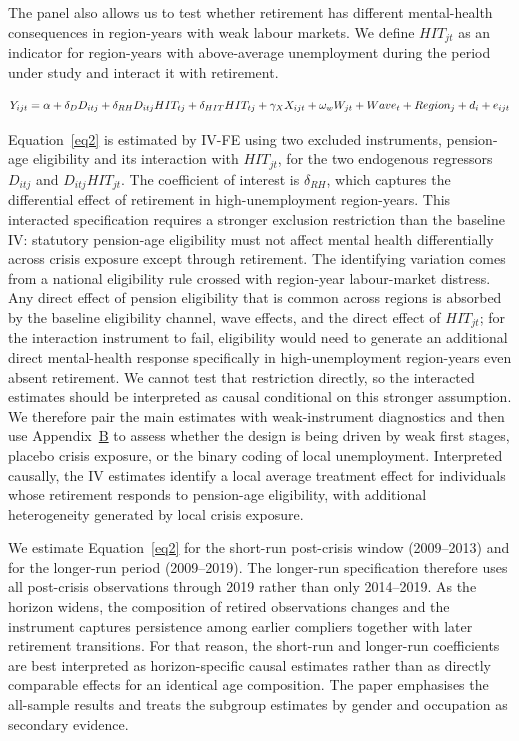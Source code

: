 \documentclass[arguments, manuscript, 11pt]{aastex631}
\begin{document}
The panel also allows us to test whether retirement has different mental-health consequences in region-years with weak labour markets. We define $HIT_{jt}$ as an indicator for region-years with above-average unemployment during the period under study and interact it with retirement.


\begin{equation}
\label{eq2}
\centering
  Y_{ijt} =\alpha + \delta_{D} D_{itj} + \delta_{RH} D_{itj}HIT_{tj} + \delta_{HIT} HIT_{tj} + \gamma_X X_{ijt} + \omega_w W_{jt} + Wave_{t} + Region_j + d_i + e_{ijt} 
\end{equation}

Equation~\ref{eq2} is estimated by IV-FE using two excluded instruments, pension-age eligibility and its interaction with $HIT_{jt}$, for the two endogenous regressors $D_{itj}$ and $D_{itj}HIT_{jt}$. The coefficient of interest is $\delta_{RH}$, which captures the differential effect of retirement in high-unemployment region-years. This interacted specification requires a stronger exclusion restriction than the baseline IV: statutory pension-age eligibility must not affect mental health differentially across crisis exposure except through retirement. The identifying variation comes from a national eligibility rule crossed with region-year labour-market distress. Any direct effect of pension eligibility that is common across regions is absorbed by the baseline eligibility channel, wave effects, and the direct effect of $HIT_{jt}$; for the interaction instrument to fail, eligibility would need to generate an additional direct mental-health response specifically in high-unemployment region-years even absent retirement. We cannot test that restriction directly, so the interacted estimates should be interpreted as causal conditional on this stronger assumption. We therefore pair the main estimates with weak-instrument diagnostics and then use Appendix~\hyperref[sec:appendixB]{B} to assess whether the design is being driven by weak first stages, placebo crisis exposure, or the binary coding of local unemployment. Interpreted causally, the IV estimates identify a local average treatment effect for individuals whose retirement responds to pension-age eligibility, with additional heterogeneity generated by local crisis exposure.

We estimate Equation~\ref{eq2} for the short-run post-crisis window (2009--2013) and for the longer-run period (2009--2019). The longer-run specification therefore uses all post-crisis observations through 2019 rather than only 2014--2019. As the horizon widens, the composition of retired observations changes and the instrument captures persistence among earlier compliers together with later retirement transitions. For that reason, the short-run and longer-run coefficients are best interpreted as horizon-specific causal estimates rather than as directly comparable effects for an identical age composition. The paper emphasises the all-sample results and treats the subgroup estimates by gender and occupation as secondary evidence.
\end{document}
